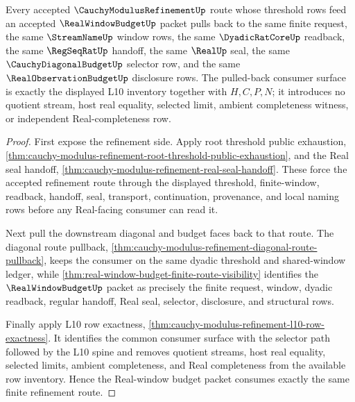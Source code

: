 \begin{theorem}
\label{thm:cauchy-modulus-refinement-real-window-budget-pullback}
Every accepted $\CauchyModulusRefinementUp$ route whose threshold rows feed an
accepted $\RealWindowBudgetUp$ packet pulls back to the same finite request,
the same $\StreamNameUp$ window rows, the same $\DyadicRatCoreUp$ readback, the
same $\RegSeqRatUp$ handoff, the same $\RealUp$ seal, the same
$\CauchyDiagonalBudgetUp$ selector row, and the same
$\RealObservationBudgetUp$ disclosure rows. The pulled-back consumer surface is
exactly the displayed L10 inventory together with $H,C,P,N$; it introduces no
quotient stream, host real equality, selected limit, ambient completeness
witness, or independent Real-completeness row.
\end{theorem}
\begin{proof}
First expose the refinement side. Apply root threshold public exhaustion,
\autoref{thm:cauchy-modulus-refinement-root-threshold-public-exhaustion}, and
the Real seal handoff,
\autoref{thm:cauchy-modulus-refinement-real-seal-handoff}. These force the
accepted refinement route through the displayed threshold, finite-window,
readback, handoff, seal, transport, continuation, provenance, and local naming
rows before any Real-facing consumer can read it.

Next pull the downstream diagonal and budget faces back to that route. The
diagonal route pullback,
\autoref{thm:cauchy-modulus-refinement-diagonal-route-pullback}, keeps the
consumer on the same dyadic threshold and shared-window ledger, while
\autoref{thm:real-window-budget-finite-route-visibility} identifies the
$\RealWindowBudgetUp$ packet as precisely the finite request, window, dyadic
readback, regular handoff, Real seal, selector, disclosure, and structural
rows.

Finally apply L10 row exactness,
\autoref{thm:cauchy-modulus-refinement-l10-row-exactness}. It identifies the
common consumer surface with the selector path followed by the L10 spine and
removes quotient streams, host real equality, selected limits, ambient
completeness, and Real completeness from the available row inventory. Hence the
Real-window budget packet consumes exactly the same finite refinement route.
\end{proof}

